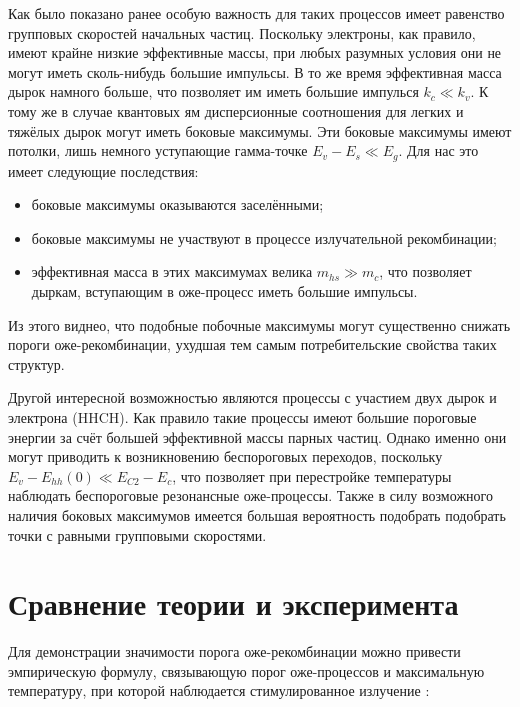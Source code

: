 \documentclass[../main.tex]{subfiles}
\begin{document}
        Как было показано ранее особую важность для таких процессов имеет
        равенство групповых скоростей начальных частиц. Поскольку электроны, как правило,
        имеют крайне низкие эффективные массы, при любых разумных условия они не могут иметь
        сколь-нибудь большие импульсы. В то же время эффективная масса дырок намного больше,
        что позволяет им иметь большие импулься $k_c \ll k_v$. К тому же в случае квантовых ям
        дисперсионные соотношения для легких и тяжёлых дырок могут иметь боковые максимумы.
        Эти боковые максимумы имеют потолки, лишь немного уступающие гамма-точке 
        $E_v - E_s \ll E_g$. Для нас это имеет следующие последствия:
        \begin{itemize}
            \item боковые максимумы оказываются заселёнными;
            \item боковые максимумы не участвуют в процессе излучательной рекомбинации;
            \item эффективная масса в этих максимумах велика $m_{hs} \gg m_c$, что позволяет
                дыркам, вступающим в оже-процесс иметь большие импульсы.
        \end{itemize}
        
        Из этого виднео, что подобные побочные максимумы могут существенно снижать пороги 
        оже-рекомбинации, ухудшая тем самым потребительские свойства таких структур.

        Другой интересной возможностью являются процессы с участием двух дырок и 
        электрона (HHCH). Как правило такие процессы имеют большие пороговые энергии
        за счёт большей эффективной массы парных частиц.
        Однако именно они могут приводить к возникновению беспороговых переходов,
        поскольку $E_v - E_{hh}(0) \ll E_{C2} - E_c$, что позволяет при перестройке
        температуры наблюдать беспороговые резонансные оже-процессы. Также в силу 
        возможного наличия боковых максимумов имеется большая вероятность подобрать
        подобрать точки с равными групповыми скоростями.

        \section{Сравнение теории и эксперимента}

        Для демонстрации значимости порога оже-рекомбинации можно привести эмпирическую 
        формулу, связывающую порог оже-процессов и максимальную температуру, при которой
        наблюдается стимулированное излучение \cite{Rumyantsev:PTS:2018}:
\end{document}
